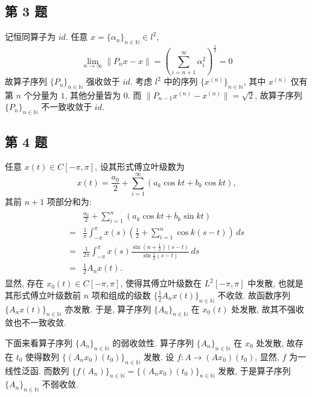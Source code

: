 \documentclass[../main.tex]{subfiles}
\begin{document}
\subsection{第 3 题}
记恒同算子为 $id$.
任意 $x = \{ \alpha_{n} \}_{n \in \mathbb{N}} \in l^2$,
\[
    \lim_{n \to \infty} \| P_n x - x \|
    = \left( \sum_{i = n + 1}^{\infty} \alpha_i^2 \right)^{\frac{1}{2}}
    = 0
\]
故算子序列 $\{ P_{n} \}_{n \in \mathbb{N}}$ 强收敛于 $id$.
考虑 $l^2$ 中的序列 $\{ x^{(n)} \}_{n \in \mathbb{N}}$,
其中 $x^{(n)}$ 仅有第 $n$ 个分量为 $1$, 其他分量皆为 $0$.
而 $\| P_{n - 1} x^{(n)} - x^{(n)} \| = \sqrt{2}$,
故算子序列 $\{ P_{n} \}_{n \in \mathbb{N}}$ 不一致收敛于 $id$.

\subsection{第 4 题}
任意 $x(t) \in C[-\pi, \pi]$, 设其形式傅立叶级数为
\[
    x(t) = \frac{a_0}{2} + \sum_{i = 1}^{\infty}(a_k \cos{kt} + b_k \cos{kt}),
\]
其前 $n + 1$ 项部分和为:
\begin{align}
    \begin{split} \label{eq:1}
         & \frac{a_0}{2} + \sum_{i = 1}^{n}(a_k \cos kt + b_k \sin kt) \\
        =& \frac{1}{\pi} \int_{-\pi}^{\pi} x(s)(\frac{1}{2} + \sum_{i = 1}^{n} \cos k(s - t)) \, ds \\
        =& \frac{1}{2 \pi} \int_{-\pi}^{\pi} x(s) \frac{\sin (n + \frac{1}{2})(s - t)}{\sin \frac{1}{2}(s - t)} \, ds \\
        =& \frac{1}{2} A_n x(t).
    \end{split}
\end{align}
显然, 存在 $x_0(t) \in C[-\pi, \pi]$,
使得其傅立叶级数在 $L^2 [-\pi, \pi]$ 中发散,
也就是其形式傅立叶级数前 $n$ 项和组成的级数 $\{ \frac{1}{2} A_n x(t) \}_{n \in \mathbb{N}}$ 不收敛.
故函数序列 $\{ A_n x(t) \}_{n \in \mathbb{N}}$ 亦发散.
于是, 算子序列 $\{ A_n \}_{n \in \mathbb{N}}$ 在 $x_0(t)$ 处发散,
故其不强收敛也不一致收敛.

下面来看算子序列 $\{ A_n \}_{n \in \mathbb{N}}$ 的弱收敛性.
算子序列 $\{ A_n \}_{n \in \mathbb{N}}$ 在 $x_0$ 处发散,
故存在 $t_0$ 使得数列 $\{ (A_n x_0)(t_0) \}_{n \in \mathbb{N}}$ 发散.
设 $f: A \to (A x_0)(t_0)$, 显然, $f$ 为一线性泛函.
而数列 $\{ f(A_n) \}_{n \in \mathbb{N}} = \{ (A_n x_0)(t_0) \}_{n \in \mathbb{N}}$ 发散,
于是算子序列 $\{ A_n \}_{n \in \mathbb{N}}$ 不弱收敛.
\end{document}
